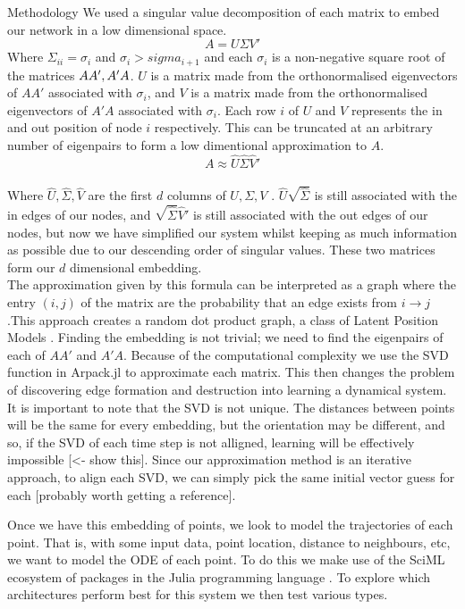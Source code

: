 \documentclass{article}
\begin{document}
\begin{section}{Methodology}
    We used a singular value decomposition of each matrix to embed our network in a low dimensional space.\
        \[
        A = U\Sigma V'
        \]
    Where $\Sigma_{ii} = \sigma_i$ and $\sigma_i > sigma_{i+1}$ and each $\sigma_i$ is a non-negative square root of the matrices $AA', \space A'A$. $U$ is a matrix made from the orthonormalised eigenvectors of $AA'$ associated with $\sigma_i$, and $V$ is a matrix made from the orthonormalised eigenvectors of $A'A$ associated with $\sigma_i$. Each row $i$ of $U$ and $V$ represents the in and out position of node $i$ respectively. This can be truncated at an arbitrary number of eigenpairs to form a low dimentional approximation to $A$.
        \[
        A \approx \hat U \hat \Sigma \hat V'
        \]\\
    Where $\hat U, \hat \Sigma, \hat V$ are the first $d$ columns of $U, \Sigma, V$ \cite{golub1971singular}. $\hat U \sqrt{\hat \Sigma}$ is still associated with the in edges of our nodes, and $\sqrt{\hat \Sigma} \hat V' $ is still associated with the out edges of our nodes, but now we have simplified our system whilst keeping as much information as possible due to our descending order of singular values. These two matrices form our $d$ dimensional embedding.\\

    The approximation given by this formula can be interpreted as a graph where the entry $(i,j)$ of the matrix are the probability that an edge exists from $i \rightarrow j$.This approach creates a random dot product graph\cite{athreya2017statistical}, a class of Latent Position Models \cite{hoff2002latent}. Finding the embedding is not trivial; we need to find the eigenpairs of each of $AA'$ and $A'A$. Because of the computational complexity we use the SVD function in Arpack.jl to approximate each matrix. This then changes the problem of discovering edge formation and destruction into learning a dynamical system.\\
    It is important to note that the SVD is not unique. The distances between points will be the same for every embedding, but the orientation may be different, and so, if the SVD of each time step is not alligned, learning will be effectively impossible [<- show this]. Since our approximation method is an iterative approach, to align each SVD, we can simply pick the same initial vector guess for each [probably worth getting a reference].  
    
    Once we have this embedding of points, we look to model the trajectories of each point. That is, with some input data, point location, distance to neighbours, etc, we want to model the ODE of each point. To do this we make use of the SciML ecosystem of packages in the Julia programming language \cite{SciML_C_Rak}. To explore which architectures perform best for this system we then test various types. ~~~~~~~~~~~~~~~~~~~~~~~~\\
    

\end{section}
\end{document}
